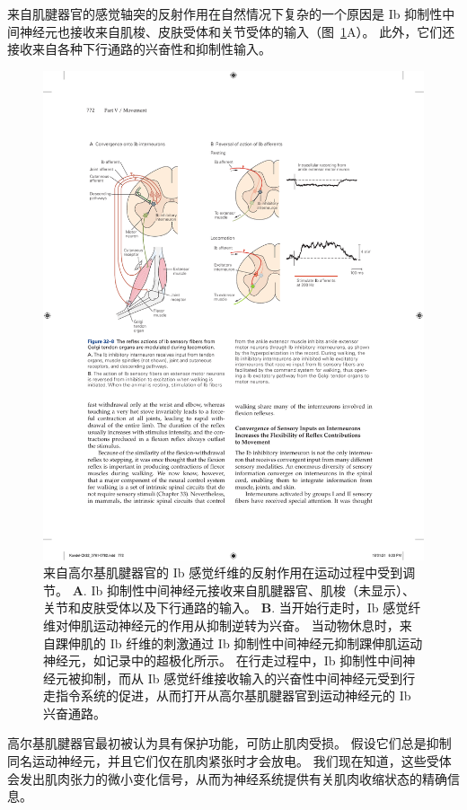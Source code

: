 来自肌腱器官的感觉轴突的反射作用在自然情况下复杂的一个原因是 Ib 抑制性中间神经元也接收来自肌梭、皮肤受体和关节受体的输入（图~\ref{fig:32_8}A）。
此外，它们还接收来自各种下行通路的兴奋性和抑制性输入。


\begin{figure}[htbp]
	\centering
	\includegraphics[width=0.9\linewidth]{chap32/fig_32_8}
	\caption{来自高尔基肌腱器官的 Ib 感觉纤维的反射作用在运动过程中受到调节。
	\textbf{A}. Ib 抑制性中间神经元接收来自肌腱器官、肌梭（未显示）、关节和皮肤受体以及下行通路的输入。
	\textbf{B}. 当开始行走时，Ib 感觉纤维对伸肌运动神经元的作用从抑制逆转为兴奋。 当动物休息时，来自踝伸肌的 Ib 纤维的刺激通过 Ib 抑制性中间神经元抑制踝伸肌运动神经元，如记录中的超极化所示。
	在行走过程中，Ib 抑制性中间神经元被抑制，而从 Ib 感觉纤维接收输入的兴奋性中间神经元受到行走指令系统的促进，从而打开从高尔基肌腱器官到运动神经元的 Ib 兴奋通路。}
	\label{fig:32_8}
\end{figure}


高尔基肌腱器官最初被认为具有保护功能，可防止肌肉受损。
假设它们总是抑制同名运动神经元，并且它们仅在肌肉紧张时才会放电。
我们现在知道，这些受体会发出肌肉张力的微小变化信号，从而为神经系统提供有关肌肉收缩状态的精确信息。


